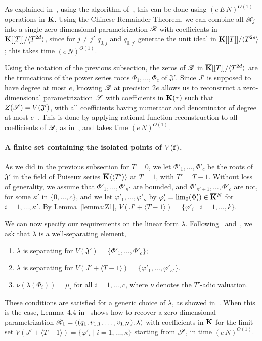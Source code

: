 \documentclass[12pt]{article}
\begin{document}
As explained in~\cite[Section~2.2]{SaSc16}, using the algorithm
of~\cite{GiLeSa01}, this can be done using $(e\,E\,N)^{O(1)}$
operations in $\mathbf{K}$. Using the Chinese Remainder Theorem, we can
combine all $\mathscr{R}_{j}$ into a single zero-dimensional parametrization
$\mathscr{R}$ with coefficients in $\mathbf{K}[[T]]/\langle T^{2d}\rangle$,
since for $j\ne j'$ $q_{0,j}$ and $q_{0,j'}$ generate the unit ideal
in $\mathbf{K}[[T]]/\langle T^{2e}\rangle$; this takes time
$(e\,N)^{O(1)}$.

Using the notation of the previous subsection, the zeros of $\mathscr{R}$ in
$\overline{\mathbf{K}}[[T]]/\langle T^{2d}\rangle$ are the truncations of the power
series roots $\Phi_1,\dots,\Phi_c$ of $\mathfrak{J}'$. Since $J'$ is
supposed to have degree at most $e$, knowing $\mathscr{R}$ at precision $2e$
allows us to reconstruct a zero-dimensional parametrization $\mathscr{S}$
with coefficients in $\mathbf{K}(\tau)$ such that
$Z(\mathscr{S})=V(\mathfrak{J}')$, with all coefficients having numerator
and denominator of degree at most $e$~\cite[Theorem~1]{Schost03}.
This is done by applying rational function reconstruction to all
coefficients of $\mathscr{R}$, as in~\cite{Schost03}, and takes time
$(e\,N)^{O(1)}$.


\paragraph{A finite set containing the isolated points of $V(\mathbf{f})$.}
As we did in the previous subsection for $T=0$, we let
$\Phi'_1,\dots,\Phi'_c$ be the roots of $\mathfrak{J}'$ in the field
of Puiseux series $\overline{\mathbf{K}}\langle\langle T'\rangle\rangle$ at $T=1$,
with $T'=T-1$. Without loss of generality, we assume that
$\Phi'_1,\dots,\Phi'_{\kappa'}$ are bounded, and
$\Phi'_{\kappa'+1},\dots,\Phi'_c$ are not, for some $\kappa'$ in
$\{0,\dots,c\}$, and we let $\varphi'_1,\dots,\varphi'_\kappa$ by
$\varphi'_i=\lim_0(\Phi'_i)\in\overline{\mathbf{K}}{}^N$ for $i=1,\dots,\kappa'$.  By
Lemma~\ref{lemma:Z1}, $V(J' + \langle T-1\rangle) = \{ \varphi'_i \mid
i=1,\dots,k\}$.

We can now specify our requirements on the linear form $\lambda$.
Following~\cite{RRS} and~\cite{SaSc16}, we ask that $\lambda$ is a {\rm well-separating
  element},
\begin{enumerate}
\item $\lambda$ is separating for $V(\mathfrak{J}')=\{\Phi'_1,\dots,\Phi'_c\}$;
\item $\lambda$ is separating for $V(J' + \langle T-1\rangle) = \{ \varphi'_1,\dots,\varphi'_{\kappa'}\}$.
\item $\nu(\lambda(\Phi_i)) = \mu_i$ for all $i=1,\dots,c$, where $\nu$ denotes
 the $T'$-adic valuation.
\end{enumerate}
These conditions are satisfied for a generic choice of $\lambda$, as
showed in~\cite{SaSc16}. When this is the case, Lemma~4.4
in~\cite{RRS} shows how to recover a zero-dimensional parametrization
$\mathscr{R}_1=((q_1,v_{1,1},\dots,v_{1,N}),\lambda)$ with coefficients in
$\mathbf{K}$ for the limit set $V(J' + \langle T-1\rangle) =\{\varphi'_i \mid i=1,\dots,\kappa\}$
starting from $\mathscr{S}$, in time $(e\,N)^{O(1)}$.
\end{document}
